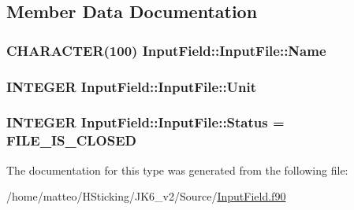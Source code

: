 \subsection{Member Data Documentation}
\hypertarget{type_input_field_1_1_input_file_a1731f4e55040b6630d6933f9b55ca1a3}{
\subsubsection[{Name}]{\setlength{\rightskip}{0pt plus 5cm}CHARACTER(100) {\bf InputField::InputFile::Name}}}
\label{type_input_field_1_1_input_file_a1731f4e55040b6630d6933f9b55ca1a3}
\hypertarget{type_input_field_1_1_input_file_ac772de8ff66ba14e860a064f2fd7c781}{
\subsubsection[{Unit}]{\setlength{\rightskip}{0pt plus 5cm}INTEGER {\bf InputField::InputFile::Unit}}}
\label{type_input_field_1_1_input_file_ac772de8ff66ba14e860a064f2fd7c781}
\hypertarget{type_input_field_1_1_input_file_af70102c64dcb62c287d0600f8ab97b85}{
\subsubsection[{Status}]{\setlength{\rightskip}{0pt plus 5cm}INTEGER {\bf InputField::InputFile::Status} = {\bf FILE\_\-IS\_\-CLOSED}}}
\label{type_input_field_1_1_input_file_af70102c64dcb62c287d0600f8ab97b85}


The documentation for this type was generated from the following file:\begin{DoxyCompactItemize}
\item 
/home/matteo/HSticking/JK6\_\-v2/Source/\hyperlink{_input_field_8f90}{InputField.f90}\end{DoxyCompactItemize}
